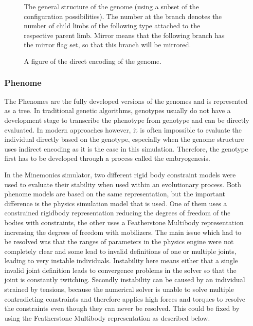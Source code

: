 \documentclass[main]{subfiles}
\begin{document}
\begin{figure}[H]
\center


\caption[Possible indirectly encoded genome]{The general structure of the genome (using a subset of the configuration possibilities). The number at the branch denotes the number of child limbs of the following type attached to the respective parent limb. Mirror means that the following branch has the mirror flag set, so that this branch will be mirrored.}
\label{figure:indirect-genotype}
\end{figure}

\begin{figure}[H]
\centering


\caption[Directly encoded genome]{A figure of the direct encoding of the genome.}
\label{figure:direct-encoding}
\end{figure}

\subsubsection{Phenome}

The Phenomes are the fully developed versions of the genomes and is represented as a tree. %
%
In traditional genetic algorithms, genotypes usually do not have a development stage to transcribe the phenotype from genotype and can be directly evaluated. %
%
In modern approaches however, it is often impossible to evaluate the individual directly based on the genotype, especially when the genome structure uses indirect encoding as it is the case in this simulation. %
%
Therefore, the genotype first has to be developed through a process called the embryogenesis.

In the Minemonics simulator, two different rigid body constraint models were used to evaluate their stability when used within an evolutionary process. %
%
Both phenome models are based on the same representation, but the important difference is the physics simulation model that is used. %
%
One of them uses a constrained rigidbody representation reducing the degrees of freedom of the bodies with constraints, the other uses a Featherstone Multibody representation increasing the degrees of freedom with mobilizers. %
%
The main issue which had to be resolved was that the ranges of parameters in the physics engine were not completely clear and some lead to invalid definitions of one or multiple joints, leading to very instable individuals. %
%
Instability here means either that a single invalid joint definition leads to convergence problems in the solver so that the joint is constantly twitching. %
%
Secondly instability can be caused by an individual strained by tensions, because the numerical solver is unable to solve multiple contradicting constraints and therefore applies high forces and torques to resolve the constraints even though they can never be resolved. %
%
This could be fixed by using the Featherstone Multibody representation as described below. 
\end{document}
